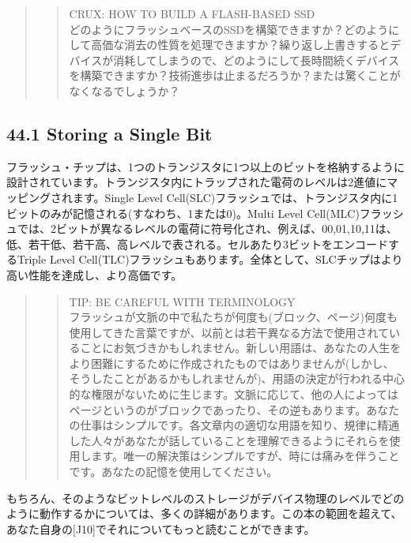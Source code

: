 \begin{quote}
\begin{quote}
CRUX: HOW TO BUILD A FLASH-BASED SSD\\
どのようにフラッシュベースのSSDを構築できますか？どのようにして高価な消去の性質を処理できますか？繰り返し上書きするとデバイスが消耗してしまうので、どのようにして長時間続くデバイスを構築できますか？技術進歩は止まるだろうか？または驚くことがなくなるでしょうか？
\end{quote}
\end{quote}

\hypertarget{storing-a-single-bit}{%
\subsection*{44.1 Storing a Single Bit}\label{storing-a-single-bit}}

フラッシュ・チップは、1つのトランジスタに1つ以上のビットを格納するように設計されています。トランジスタ内にトラップされた電荷のレベルは2進値にマッピングされます。Single
Level
Cell(SLC)フラッシュでは、トランジスタ内に1ビットのみが記憶される(すなわち、1または0)。Multi
Level
Cell(MLC)フラッシュでは、2ビットが異なるレベルの電荷に符号化され、例えば、00,01,10,11は、低、若干低、若干高、高レベルで表される。セルあたり3ビットをエンコードするTriple
Level
Cell(TLC)フラッシュもあります。全体として、SLCチップはより高い性能を達成し、より高価です。

\begin{quote}
\begin{quote}
TIP: BE CAREFUL WITH TERMINOLOGY\\
フラッシュが文脈の中で私たちが何度も(ブロック、ページ)何度も使用してきた言葉ですが、以前とは若干異なる方法で使用されていることにお気づきかもしれません。新しい用語は、あなたの人生をより困難にするために作成されたものではありませんが(しかし、そうしたことがあるかもしれませんが)、用語の決定が行われる中心的な権限がないために生じます。文脈に応じて、他の人によってはページというのがブロックであったり、その逆もあります。あなたの仕事はシンプルです。各文章内の適切な用語を知り、規律に精通した人々があなたが話していることを理解できるようにそれらを使用します。唯一の解決策はシンプルですが、時には痛みを伴うことです。あなたの記憶を使用してください。
\end{quote}
\end{quote}

もちろん、そのようなビットレベルのストレージがデバイス物理のレベルでどのように動作するかについては、多くの詳細があります。この本の範囲を超えて、あなた自身の{[}J10{]}でそれについてもっと読むことができます。

